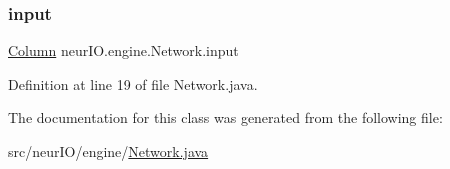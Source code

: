 \subsubsection{\texorpdfstring{input}{input}}
{\footnotesize\ttfamily \hyperlink{classneur_i_o_1_1engine_1_1_column}{Column} neur\+I\+O.\+engine.\+Network.\+input}



Definition at line 19 of file Network.\+java.



The documentation for this class was generated from the following file\+:\begin{DoxyCompactItemize}
\item 
src/neur\+I\+O/engine/\hyperlink{_network_8java}{Network.\+java}\end{DoxyCompactItemize}
